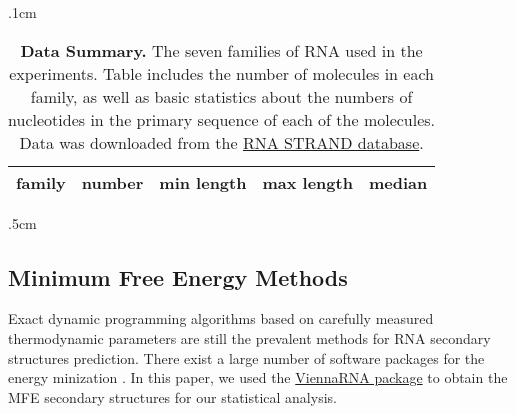 \documentclass[10pt,letterpaper]{article}
\begin{document}
\vglue .1cm
\begin{table}[h!]
\begin{center}
\begin{tabular}{ l || r | r | r| r}
\hglue 5mm {\bf family} & {\bf number} & {\bf min length} & {\bf max length} & {\bf median} \\ \hline \hline

\end{tabular}
\vglue .5cm
\caption{\footnotesize {\bf Data Summary.} The seven families of RNA used in the experiments. Table includes the number of molecules in each family, as well as basic statistics about the numbers of nucleotides in the primary sequence of each of the molecules. Data was downloaded from the \href{http://www.rnasoft.ca/strand/}{RNA STRAND database}.}
\label{table:lengths}
\end{center}
\end{table}


\subsection*{Minimum Free Energy Methods}

Exact dynamic programming algorithms based on carefully measured thermodynamic parameters are still the prevalent methods for RNA secondary structures prediction. There exist a large number of software packages for the energy minization \cite{Lorenz2011-eb, Markham2008-ku, Reuter2010-bw, Zadeh2011-eu, Hamada2009-yf, Ding2003-sv, Reeder2009-xl}. In this paper, we used the \href{https://www.tbi.univie.ac.at/RNA/}{ViennaRNA package} \cite{Lorenz2011-eb} to obtain the MFE secondary structures for our statistical analysis.
\end{document}
